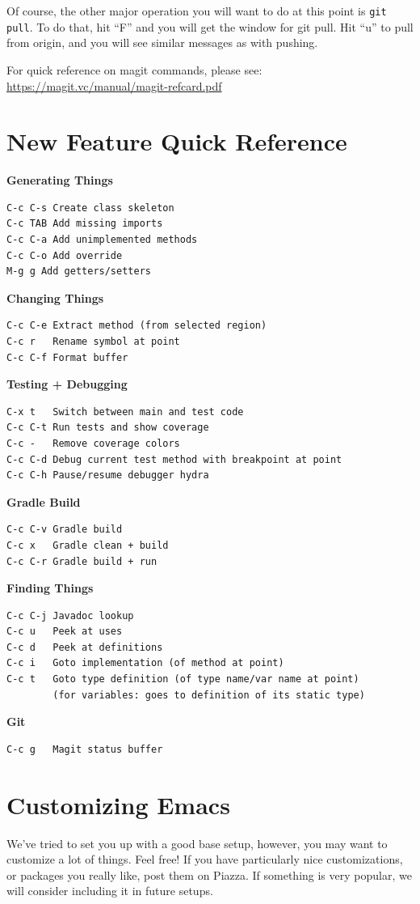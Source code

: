 \documentclass[12pt]{article}
\begin{document}
Of course, the other major operation you will want to do at this point
is \verb+git pull+.  To do that, hit ``F'' and you will get the window
for git pull.  Hit ``u'' to pull from origin, and you will see similar
messages as with pushing.

For quick reference on magit commands, please see:
\url{https://magit.vc/manual/magit-refcard.pdf}

\section{New Feature Quick Reference}
\label{Sec:QuickRef}

\textbf{Generating Things}
\begin{verbatim}
C-c C-s Create class skeleton
C-c TAB Add missing imports
C-c C-a Add unimplemented methods
C-c C-o Add override
M-g g Add getters/setters
\end{verbatim}
\noindent\textbf{Changing Things}
\begin{verbatim}
C-c C-e Extract method (from selected region)
C-c r   Rename symbol at point
C-c C-f Format buffer
\end{verbatim}

\noindent\textbf{Testing + Debugging}
\begin{verbatim}
C-x t   Switch between main and test code
C-c C-t Run tests and show coverage
C-c -   Remove coverage colors
C-c C-d Debug current test method with breakpoint at point
C-c C-h Pause/resume debugger hydra
\end{verbatim}

\noindent\textbf{Gradle Build}
\begin{verbatim}
C-c C-v Gradle build
C-c x   Gradle clean + build
C-c C-r Gradle build + run
\end{verbatim}

\noindent\textbf{Finding Things}
\begin{verbatim}
C-c C-j Javadoc lookup
C-c u   Peek at uses
C-c d   Peek at definitions
C-c i   Goto implementation (of method at point)
C-c t   Goto type definition (of type name/var name at point)
        (for variables: goes to definition of its static type)
\end{verbatim}
\noindent\textbf{Git}
\begin{verbatim}
C-c g   Magit status buffer
\end{verbatim}
\newpage
\section{Customizing Emacs}
We've tried to set you up with a good base setup, however,
you  may want to customize a lot of things. Feel free!  If you
have particularly nice customizations, or packages you really like,
post them on Piazza.  If something is very popular, we will consider
including it in future setups.
\end{document}
